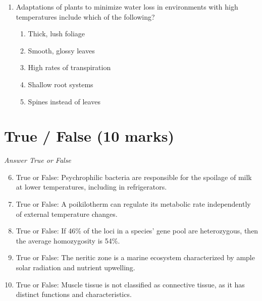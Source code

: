 \documentclass[12pt]{article}
\begin{document}
\begin{enumerate}[label=\arabic*.]
\begin{enumerate}[label=(\alph*)]
    \item Taste, wind direction, humidity
    \item Atmospheric oxygen levels, plant growth, tidal patterns
    \item Infrared radiation, sound frequency, barometric pressure
    \item Moon phases, echo location, gravitational pull
    \item Sunlight intensity, water current, soil composition
\end{enumerate}
\item Adaptations of plants to minimize water loss in environments with high temperatures include which of the following?
\begin{enumerate}[label=(\alph*)]
    \item Thick, lush foliage
    \item Smooth, glossy leaves
    \item High rates of transpiration
    \item Shallow root systems
    \item Spines instead of leaves
\end{enumerate}
\end{enumerate}

\section*{True / False (10 marks)}
\textit{Answer True or False}
\begin{enumerate}[label=\arabic*.]
\setcounter{enumi}{5}
\item True or False: Psychrophilic bacteria are responsible for the spoilage of milk at lower temperatures, including in refrigerators.
\item True or False: A poikilotherm can regulate its metabolic rate independently of external temperature changes.
\item True or False: If 46\% of the loci in a species' gene pool are heterozygous, then the average homozygosity is 54\%.
\item True or False: The neritic zone is a marine ecosystem characterized by ample solar radiation and nutrient upwelling.
\item True or False: Muscle tissue is not classified as connective tissue, as it has distinct functions and characteristics.
\end{enumerate}
\end{document}
